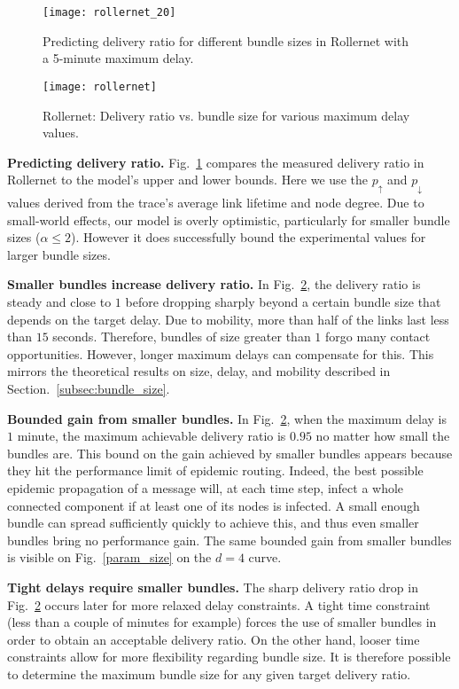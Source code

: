 \documentclass[final,journal,letterpaper]{IEEEtran}
\begin{document}
\begin{figure}[t]
  \centering
  \texttt{[image: rollernet\_20]}
  \caption{Predicting delivery ratio for different bundle sizes in Rollernet with a 5-minute maximum delay.}
  \label{exp_theory}
\end{figure}

\begin{figure}[t]
  \centering
  \texttt{[image: rollernet]}
  \caption{Rollernet: Delivery ratio vs. bundle size for various maximum delay values.}
  \label{exp_results}
\end{figure}


\noindent\textbf{Predicting delivery ratio.} Fig.~\ref{exp_theory} compares the measured delivery ratio in Rollernet to the model's upper and lower bounds. Here we use the $p_\uparrow$ and $p_\downarrow$ values derived from the trace's average link lifetime and node degree. Due to small-world effects, our model is overly optimistic, particularly for smaller bundle sizes ($\alpha \le 2$). However it does successfully bound the experimental values for larger bundle sizes.

\noindent\textbf{Smaller bundles increase delivery ratio.} In Fig.~\ref{exp_results}, the delivery ratio is steady and close to $1$ before dropping sharply beyond a certain bundle size that depends on the target delay. Due to mobility, more than half of the links last less than $15$ seconds. Therefore, bundles of size greater than $1$ forgo many contact opportunities. However, longer maximum delays can compensate for this. This mirrors the theoretical results on size, delay, and mobility described in Section.~\ref{subsec:bundle_size}.

\noindent\textbf{Bounded gain from smaller bundles.} In Fig.~\ref{exp_results}, when the maximum delay is $1$ minute, the maximum achievable delivery ratio is $0.95$ no matter how small the bundles are. This bound on the gain achieved by smaller bundles appears because they hit the performance limit of epidemic routing. Indeed, the best possible epidemic propagation of a message will, at each time step, infect a whole connected component if at least one of its nodes is infected. A small enough bundle can spread sufficiently quickly to achieve this, and thus even smaller bundles bring no performance gain. The same bounded gain from smaller bundles is visible on Fig.~\ref{param_size} on the $d=4$ curve.

\noindent\textbf{Tight delays require smaller bundles.} The sharp delivery ratio drop in Fig.~\ref{exp_results} occurs later for more relaxed delay constraints. A tight time constraint (less than a couple of minutes for example) forces the use of smaller bundles in order to obtain an acceptable delivery ratio. On the other hand, looser time constraints allow for more flexibility regarding bundle size. It is therefore possible to determine the maximum bundle size for any given target delivery ratio. 
\end{document}

